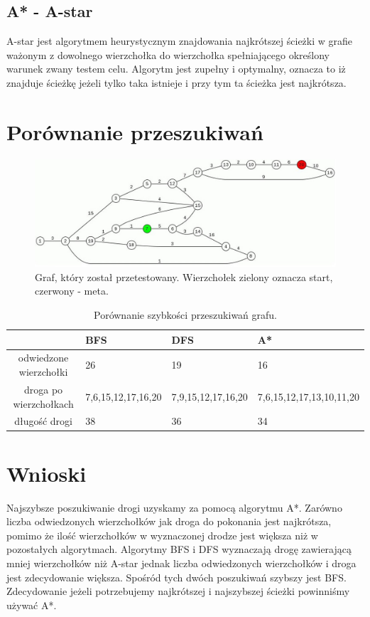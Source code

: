 \documentclass{article}
\begin{document}
\subsection{A* - A-star}
A-star jest algorytmem heurystycznym znajdowania najkrótszej ścieżki w grafie ważonym  z dowolnego wierzchołka do wierzchołka spełniającego określony warunek zwany testem celu. Algorytm jest zupełny i optymalny, oznacza to iż znajduje ścieżkę jeżeli tylko taka istnieje i przy tym ta ścieżka jest najkrótsza. 
 
\section{Porównanie przeszukiwań}
\begin{figure}[h]
	\centering
	\includegraphics[scale=0.5]{grafik.jpg}
	\caption{Graf, który został przetestowany. Wierzchołek zielony oznacza start, czerwony - meta.}
	\end{figure}
	\newpage
	
	\begin{table}
	\caption{Porównanie szybkości przeszukiwań grafu.}
	\begin{center}
	\begin{tabular}{|c||l||l||l|}
	\hline  & BFS & DFS & A* \\ \hline 
	odwiedzone wierzchołki & 26 & 19 & 16 \\ \hline
	droga po wierzchołkach & 7,6,15,12,17,16,20 & 7,9,15,12,17,16,20 & 7,6,15,12,17,13,10,11,20 \\ \hline
	długość drogi & 38 & 36 & 34 \\ \hline
	\end{tabular}
	\end{center}		 
	\end{table}
\section{Wnioski}
Najszybsze poszukiwanie drogi uzyskamy za pomocą algorytmu A*. Zarówno liczba odwiedzonych wierzchołków jak droga do pokonania jest najkrótsza, pomimo że ilość wierzchołków w wyznaczonej drodze jest większa niż w pozostałych algorytmach.
\newline
Algorytmy BFS i DFS wyznaczają drogę zawierającą mniej wierzchołków niż A-star jednak liczba odwiedzonych wierzchołków i droga jest zdecydowanie większa. Spośród tych dwóch poszukiwań szybszy jest BFS.
\newline
Zdecydowanie jeżeli potrzebujemy najkrótszej i najszybszej ścieżki powinniśmy używać A*.
\end{document}
